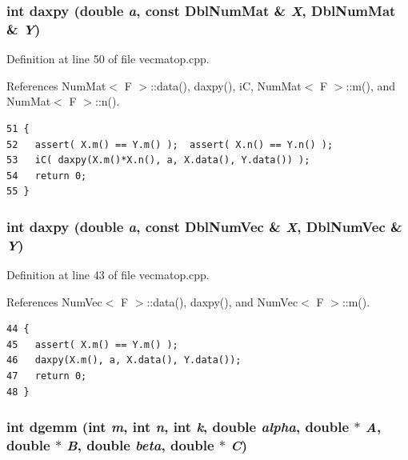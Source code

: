 \subsubsection{\setlength{\rightskip}{0pt plus 5cm}int daxpy (double {\em a}, const {\bf Dbl\-Num\-Mat} \& {\em X}, {\bf Dbl\-Num\-Mat} \& {\em Y})}\label{vecmatop_8hpp_9e02e7b9fbd857494e5ee749480735cf_9e02e7b9fbd857494e5ee749480735cf}




Definition at line 50 of file vecmatop.cpp.

References Num\-Mat$<$ F $>$::data(), daxpy(), i\-C, Num\-Mat$<$ F $>$::m(), and Num\-Mat$<$ F $>$::n().

\footnotesize\begin{verbatim}51 {
52   assert( X.m() == Y.m() );  assert( X.n() == Y.n() );
53   iC( daxpy(X.m()*X.n(), a, X.data(), Y.data()) );
54   return 0;
55 }
\end{verbatim}\normalsize 


\subsubsection{\setlength{\rightskip}{0pt plus 5cm}int daxpy (double {\em a}, const {\bf Dbl\-Num\-Vec} \& {\em X}, {\bf Dbl\-Num\-Vec} \& {\em Y})}\label{vecmatop_8hpp_217995e82dfd0f0d81770835a256a079_217995e82dfd0f0d81770835a256a079}




Definition at line 43 of file vecmatop.cpp.

References Num\-Vec$<$ F $>$::data(), daxpy(), and Num\-Vec$<$ F $>$::m().

\footnotesize\begin{verbatim}44 {
45   assert( X.m() == Y.m() );
46   daxpy(X.m(), a, X.data(), Y.data());
47   return 0;
48 }
\end{verbatim}\normalsize 


\subsubsection{\setlength{\rightskip}{0pt plus 5cm}int dgemm (int {\em m}, int {\em n}, int {\em k}, double {\em alpha}, double $\ast$ {\em A}, double $\ast$ {\em B}, double {\em beta}, double $\ast$ {\em C})}\label{vecmatop_8hpp_ab0f3ccb6c8a9c6edf137f60264afe2c_ab0f3ccb6c8a9c6edf137f60264afe2c}




